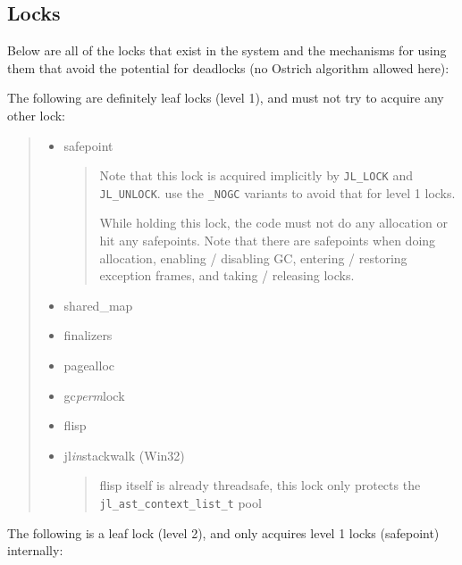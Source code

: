 \hypertarget{13071695811965191352}{}


\subsection{Locks}



Below are all of the locks that exist in the system and the mechanisms for using them that avoid the potential for deadlocks (no Ostrich algorithm allowed here):



The following are definitely leaf locks (level 1), and must not try to acquire any other lock:



\begin{quote}
\begin{itemize}
\item safepoint

\begin{quote}
Note that this lock is acquired implicitly by \texttt{JL\_LOCK} and \texttt{JL\_UNLOCK}. use the \texttt{\_NOGC} variants to avoid that for level 1 locks.

While holding this lock, the code must not do any allocation or hit any safepoints. Note that there are safepoints when doing allocation, enabling / disabling GC, entering / restoring exception frames, and taking / releasing locks.

\end{quote}

\item shared\_map


\item finalizers


\item pagealloc


\item gc\emph{perm}lock


\item flisp


\item jl\emph{in}stackwalk (Win32)

\begin{quote}
flisp itself is already threadsafe, this lock only protects the \texttt{jl\_ast\_context\_list\_t} pool

\end{quote}
\end{itemize}
\end{quote}


The following is a leaf lock (level 2), and only acquires level 1 locks (safepoint) internally:



